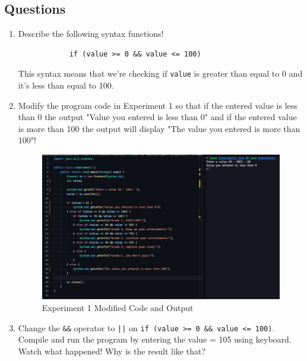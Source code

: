 \documentclass[12pt,titlepage]{article}
\begin{document}
\subsection*{Questions}
\begin{enumerate}
    \item {
        Describe the following syntax functions!
        \begin{verbatim}
            if (value >= 0 && value <= 100)
        \end{verbatim}
        This syntax means that we're checking if \texttt{value} is greater than equal to 0 and it's less than equal to 100.
    }
    \pagebreak
    \item {
        Modify the program code in Experiment 1 so that if the entered value is less than 0 the
        output "Value you entered is less than 0" and if the entered value is more than 100 the
        output will display "The value you entered is more than 100"!

        \begin{figure}[h]
            \centering
            \includegraphics[width=\textwidth]{images/experiment1-modified.png}
            \caption{Experiment 1 Modified Code and Output}
        \end{figure}
    }
    \pagebreak
    \item {
        Change the \texttt{\&\&} operator to \texttt{||} on \texttt{if (value >= 0 \&\& value <= 100)}. Compile
        and run the program by entering the value = 105 using keyboard. Watch what happened!
        Why is the result like that?

}
\end{enumerate}
\end{document}

